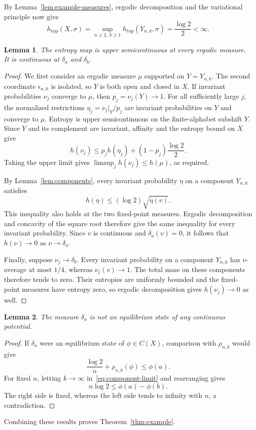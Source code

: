 \documentclass[10pt]{amsart}
\numberwithin{equation}{section}
\newtheorem{lemma}{Lemma}[section]
\begin{document}
By Lemma~\ref{lem:example-measures}, ergodic decomposition and the
variational principle now give
\[
 h_{\mathrm{top}}(X,\sigma)
 =\sup_{n\geq2,\ k\geq1}h_{\mathrm{top}}(Y_{n,k},\sigma)
 =\frac{\log2}{2}<\infty.
\]

\begin{lemma}\label{lem:example-continuity}
The entropy map is upper semicontinuous at every ergodic measure.
It is continuous at $\delta_a$ and $\delta_b$.
\end{lemma}

\begin{proof}
We first consider an ergodic measure $\mu$ supported on
$Y=Y_{n,k}$. The second coordinate $\epsilon_{n,k}$ is isolated,
so $Y$ is both open and closed in $X$. If invariant probabilities
$\nu_j$ converge to $\mu$, then $p_j=\nu_j(Y)\to1$. For all
sufficiently large $j$, the normalized restrictions
$\eta_j=\nu_j|_Y/p_j$ are invariant probabilities on $Y$ and converge
to $\mu$. Entropy is upper semicontinuous on the finite-alphabet
subshift $Y$. Since $Y$ and its complement are invariant, affinity
and the entropy bound on $X$ give
\[
 h(\nu_j)\leq p_j h(\eta_j)+(1-p_j)\frac{\log2}{2}.
\]
Taking the upper limit gives $\limsup_j h(\nu_j)\leq h(\mu)$, as
required.

By Lemma~\ref{lem:components}, every invariant probability $\eta$
on a component $Y_{n,k}$ satisfies
\[
 h(\eta)\leq(\log2)\sqrt{\eta(v)}.
\]
This inequality also holds at the two fixed-point measures.
Ergodic decomposition and concavity of the square root therefore
give the same inequality for every invariant probability.
Since $v$ is continuous and $\delta_a(v)=0$, it follows that
$h(\nu)\to0$ as $\nu\to\delta_a$.

Finally, suppose $\nu_j\to\delta_b$. Every invariant probability
on a component $Y_{n,k}$ has $v$-average at most $1/4$, whereas
$\nu_j(v)\to1$. The total mass on these components therefore tends
to zero. Their entropies are uniformly bounded and the fixed-point
measures have entropy zero, so ergodic decomposition gives
$h(\nu_j)\to0$ as well.
\end{proof}

\begin{lemma}\label{lem:example-unattainable}
The measure $\delta_a$ is not an equilibrium state of any continuous
potential.
\end{lemma}

\begin{proof}
If $\delta_a$ were an equilibrium state of $\phi\in C(X)$, comparison
with $\rho_{n,k}$ would give
\[
 \frac{\log2}{n}+\rho_{n,k}(\phi)\leq\phi(a).
\]
For fixed $n$, letting $k\to\infty$ in~\eqref{eq:component-limit}
and rearranging gives
\[
 n\log2\leq\phi(a)-\phi(b).
\]
The right side is fixed, whereas the left side tends to infinity
with $n$, a contradiction.
\end{proof}

Combining these results proves Theorem~\ref{thm:example}.



\end{document}
